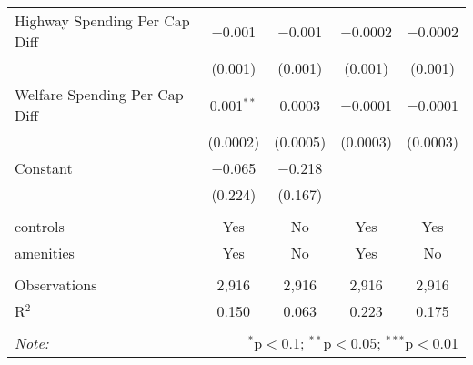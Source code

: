 \begin{table}[!htbp]
\begin{tabular}{@{\extracolsep{5pt}}lcccc}
  Highway Spending Per Cap Diff & $-$0.001 & $-$0.001 & $-$0.0002 & $-$0.0002 \\ 
  & (0.001) & (0.001) & (0.001) & (0.001) \\ 
  Welfare Spending Per Cap Diff & 0.001$^{**}$ & 0.0003 & $-$0.0001 & $-$0.0001 \\ 
  & (0.0002) & (0.0005) & (0.0003) & (0.0003) \\ 
  Constant & $-$0.065 & $-$0.218 &  &  \\ 
  & (0.224) & (0.167) &  &  \\ 
 \hline \\[-1.8ex] 
controls & Yes & No & Yes & Yes \\ 
amenities & Yes & No & Yes & No \\ 
\hline \\[-1.8ex] 
Observations & 2,916 & 2,916 & 2,916 & 2,916 \\ 
R$^{2}$ & 0.150 & 0.063 & 0.223 & 0.175 \\ 
\hline 
\hline \\[-1.8ex] 
\textit{Note:}  & \multicolumn{4}{r}{$^{*}$p$<$0.1; $^{**}$p$<$0.05; $^{***}$p$<$0.01} \\ 
\end{tabular} 
\end{table} 
